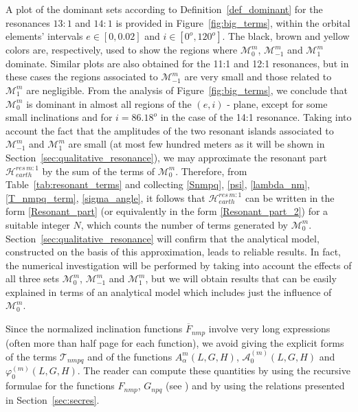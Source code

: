 \documentclass[12pt,reqno]{amsart}
\numberwithin{equation}{section}
\def\M{{\mathcal M}}
\begin{document}
A plot of the dominant sets according to Definition~\ref{def_dominant} for the resonances $13:1$ and $14:1$
is provided in Figure~\ref{fig:big_terms}, within the orbital elements' intervals
$e\in [0,0.02]$ and $i \in [0^o, 120^o]$. The black, brown and yellow colors are, respectively,
used to show the regions where $\mathcal{M}^m_0$, $\mathcal{M}^m_{-1}$ and $\mathcal{M}^m_{1}$ dominate.
Similar plots are also obtained for the 11:1 and 12:1 resonances, but
in these cases the regions associated  to $\M_{-1}^m$ are very small and
those related to $\M_1^m$ are negligible.
From the analysis of Figure~\ref{fig:big_terms}, we conclude that $\mathcal{M}^m_0$ is dominant in almost all regions of the $(e,i)$ - plane, except for some small inclinations and for $i=86.18^o$ in the case of the 14:1 resonance. Taking into account the fact that the amplitudes
of the two resonant islands associated to $\mathcal{M}^m_{-1}$ and $\mathcal{M}^m_{1}$ are small
(at most few hundred meters as it will be shown in Section~\ref{sec:qualitative_resonance}),
we may approximate the resonant part $\mathcal{H}_{earth}^{res\,m:1}$ by
the sum of the terms of $\mathcal{M}^m_0$. Therefore, from Table~\ref{tab:resonant_terms}
and collecting \eqref{Snmpq}, \eqref{psi}, \eqref{lambda_nm}, \eqref{T_nmpq_term}, \eqref{sigma_angle}, it follows that $\mathcal{H}_{earth}^{res\,m:1}$ can be written in the form \eqref{Resonant_part}
(or equivalently in the form \eqref{Resonant_part_2}) for a suitable integer $N$, which counts the number
of terms generated by $\M_0^m$.
Section~\ref{sec:qualitative_resonance} will confirm that the analytical model, constructed on the basis of this approximation,
leads to reliable results.  In fact, the numerical investigation will be performed by taking into account the effects of all three sets $\mathcal{M}^m_0$, $\mathcal{M}^m_{-1}$ and $\mathcal{M}^m_{1}$,
but we will obtain results that
can be easily explained in terms of an analytical model which includes just the influence of  $\mathcal{M}^m_0$.


Since the normalized inclination functions $\overline{F}_{nmp}$
involve very long expressions (often more than half
page for each function), we avoid giving the explicit forms of
the terms $\mathcal{T}_{nmpq}$ and of the functions
$A^{m}_{\alpha}(L,G,H)$,  $\mathcal{A}_0^{(m)}(L,G,H)$ and
$\varphi_0^{(m)}(L,G,H)$. The reader can compute these quantities by
using the recursive formulae for the functions $F_{nmp}$,
$G_{npq}$ (see \cite{Kaula,CGmajor}) and by using the relations
presented in Section~\ref{sec:secres}.
\end{document}
